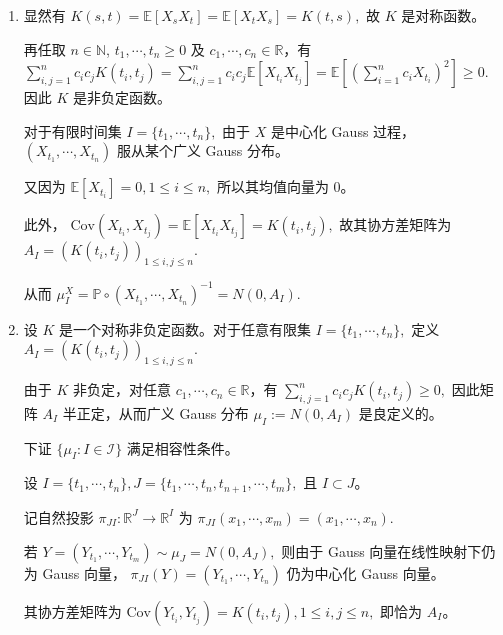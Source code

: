 \documentclass{ctexart}
\begin{document}
\begin{solution}
  \begin{enumerate}
    \item 显然有
      \( K(s,t) = \mathbb{E}[X_sX_t] = \mathbb{E}[X_tX_s] = K(t,s), \)
      故 \(K\) 是对称函数。

      再任取 \(n \in \mathbb{N}\), \(t_1,\cdots,t_n \geq 0\) 及 \(c_1,\cdots,c_n \in \mathbb{R}\)，有
      \( \sum_{i,j=1}^n c_ic_jK(t_i,t_j) = \sum_{i,j=1}^n c_ic_j \mathbb{E}[X_{t_i}X_{t_j}] = \mathbb{E}\left[\left(\sum_{i=1}^n c_iX_{t_i}\right)^2\right] \geq 0. \)
      因此 \(K\) 是非负定函数。

      对于有限时间集
      \( I = \{t_1,\cdots,t_n\}, \)
      由于 \(X\) 是中心化 Gauss 过程，
      \( (X_{t_1},\cdots,X_{t_n}) \)
      服从某个广义 Gauss 分布。

      又因为
      \( \mathbb{E}[X_{t_i}] = 0, 1 \leq i \leq n, \)
      所以其均值向量为 \(0\)。

      此外，
      \( \mathrm{Cov}(X_{t_i},X_{t_j}) = \mathbb{E}[X_{t_i}X_{t_j}] = K(t_i,t_j), \)
      故其协方差矩阵为
      \( A_I = (K(t_i,t_j))_{1 \leq i,j \leq n}. \)

      从而
      \( \mu_I^X = \mathbb{P} \circ (X_{t_1}, \cdots , X_{t_n})^{-1} = N(0,A_I). \)

    \item 设 \(K\) 是一个对称非负定函数。对于任意有限集
      \( I = \{t_1,\cdots,t_n\}, \)
      定义
      \( A_I = (K(t_i,t_j))_{1 \leq i,j \leq n}. \)

      由于 \(K\) 非负定，对任意 \(c_1,\cdots,c_n \in \mathbb{R}\)，有
      \( \sum_{i,j=1}^n c_ic_jK(t_i,t_j) \geq 0, \)
      因此矩阵 \(A_I\) 半正定，从而广义 Gauss 分布
      \( \mu_I := N(0,A_I) \)
      是良定义的。

      下证 \(\{\mu_I : I \in \mathcal{I}\}\) 满足相容性条件。

      设
      \( I = \{t_1,\cdots,t_n\}, J = \{t_1,\cdots,t_n,t_{n+1},\cdots,t_m\}, \)
      且 \(I \subset J\)。

      记自然投影
      \( \pi_{JI} : \mathbb{R}^J \to \mathbb{R}^I \)
      为
      \( \pi_{JI}(x_1,\cdots,x_m) = (x_1,\cdots,x_n). \)

      若
      \( Y = (Y_{t_1},\cdots,Y_{t_m}) \sim \mu_J = N(0,A_J), \)
      则由于 Gauss 向量在线性映射下仍为 Gauss 向量，
      \( \pi_{JI}(Y) = (Y_{t_1},\cdots,Y_{t_n}) \)
      仍为中心化 Gauss 向量。

      其协方差矩阵为
      \( \mathrm{Cov}(Y_{t_i},Y_{t_j}) = K(t_i,t_j), 1 \leq i,j \leq n, \)
      即恰为 \(A_I\)。


\end{enumerate}
\end{solution}
\end{document}
